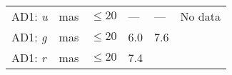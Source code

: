 \documentclass[DM, lsstdraft, toc]{lsstdoc}
\begin{document}
\begin{longtable}[]{@{}llllll@{}}
\begin{minipage}[t]{0.12\columnwidth}
AD1: \emph{u}\strut
\end{minipage} & \begin{minipage}[t]{0.06\columnwidth}\raggedright\strut
mas\strut
\end{minipage} & \begin{minipage}[t]{0.14\columnwidth}\raggedright\strut
\(\leq 20\)\strut
\end{minipage} & \begin{minipage}[t]{0.12\columnwidth}\raggedright\strut
---\strut
\end{minipage} & \begin{minipage}[t]{0.12\columnwidth}\raggedright\strut
---\strut
\end{minipage} & \begin{minipage}[t]{0.17\columnwidth}\raggedright\strut
No data\strut
\end{minipage}\tabularnewline
\begin{minipage}[t]{0.12\columnwidth}\raggedright\strut
AD1: \emph{g}\strut
\end{minipage} & \begin{minipage}[t]{0.06\columnwidth}\raggedright\strut
mas\strut
\end{minipage} & \begin{minipage}[t]{0.14\columnwidth}\raggedright\strut
\(\leq 20\)\strut
\end{minipage} & \begin{minipage}[t]{0.12\columnwidth}\raggedright\strut
6.0\strut
\end{minipage} & \begin{minipage}[t]{0.12\columnwidth}\raggedright\strut
7.6\strut
\end{minipage} & \begin{minipage}[t]{0.17\columnwidth}\raggedright\strut
\strut
\end{minipage}\tabularnewline
\begin{minipage}[t]{0.12\columnwidth}\raggedright\strut
AD1: \emph{r}\strut
\end{minipage} & \begin{minipage}[t]{0.06\columnwidth}\raggedright\strut
mas\strut
\end{minipage} & \begin{minipage}[t]{0.14\columnwidth}\raggedright\strut
\(\leq 20\)\strut
\end{minipage} & \begin{minipage}[t]{0.12\columnwidth}\raggedright\strut
7.4\strut
\end{minipage} & \begin{minipage}[t]{0.12\columnwidth}\raggedright\strut

\end{minipage}
\end{longtable}
\end{document}
